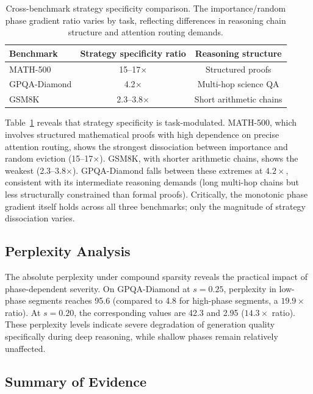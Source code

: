 \documentclass[11pt,a4paper]{article}
\begin{document}
\begin{table}[t]
\centering
\caption{Cross-benchmark strategy specificity comparison. The importance/random phase gradient ratio varies by task, reflecting differences in reasoning chain structure and attention routing demands.}
\label{tab:cross_benchmark_specificity}
\begin{tabular}{lcc}
\toprule
Benchmark & Strategy specificity ratio & Reasoning structure \\
\midrule
MATH-500 & 15--17$\times$ & Structured proofs \\
GPQA-Diamond & 4.2$\times$ & Multi-hop science QA \\
GSM8K & 2.3--3.8$\times$ & Short arithmetic chains \\
\bottomrule
\end{tabular}
\end{table}

Table~\ref{tab:cross_benchmark_specificity} reveals that strategy specificity is task-modulated. MATH-500, which involves structured mathematical proofs with high dependence on precise attention routing, shows the strongest dissociation between importance and random eviction (15--17$\times$). GSM8K, with shorter arithmetic chains, shows the weakest (2.3--3.8$\times$). GPQA-Diamond falls between these extremes at $4.2\times$, consistent with its intermediate reasoning demands (long multi-hop chains but less structurally constrained than formal proofs). Critically, the monotonic phase gradient itself holds across all three benchmarks; only the magnitude of strategy dissociation varies.

\subsection{Perplexity Analysis}

The absolute perplexity under compound sparsity reveals the practical impact of phase-dependent severity. On GPQA-Diamond at $s=0.25$, perplexity in low-phase segments reaches 95.6 (compared to 4.8 for high-phase segments, a $19.9\times$ ratio). At $s=0.20$, the corresponding values are 42.3 and 2.95 ($14.3\times$ ratio). These perplexity levels indicate severe degradation of generation quality specifically during deep reasoning, while shallow phases remain relatively unaffected.

\subsection{Summary of Evidence}
\end{document}
